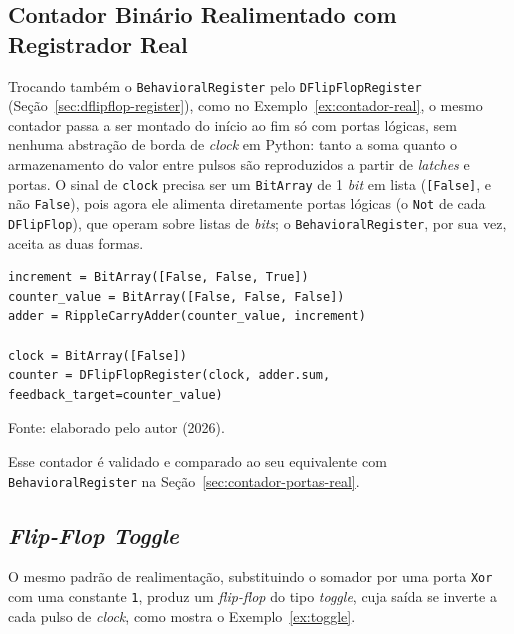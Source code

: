 \subsection{Contador Binário Realimentado com Registrador Real}
\label{sec:contador-registrador-real}

Trocando também o \texttt{BehavioralRegister} pelo \texttt{DFlipFlopRegister} (Seção~\ref{sec:dflipflop-register}), como no Exemplo~\ref{ex:contador-real}, o mesmo contador passa a ser montado do início ao fim só com portas lógicas, sem nenhuma abstração de borda de \textit{clock} em Python: tanto a soma quanto o armazenamento do valor entre pulsos são reproduzidos a partir de \textit{latches} e portas. O sinal de \texttt{clock} precisa ser um \texttt{BitArray} de 1 \textit{bit} em lista (\texttt{[False]}, e não \texttt{False}), pois agora ele alimenta diretamente portas lógicas (o \texttt{Not} de cada \texttt{DFlipFlop}), que operam sobre listas de \textit{bits}; o \texttt{BehavioralRegister}, por sua vez, aceita as duas formas.

\begin{exemplo}[H]
\caption{Contador binário de N \textit{bits} com registrador real (DFlipFlopRegister).}
\label{ex:contador-real}
\begin{verbatim}
increment = BitArray([False, False, True])
counter_value = BitArray([False, False, False])
adder = RippleCarryAdder(counter_value, increment)

clock = BitArray([False])
counter = DFlipFlopRegister(clock, adder.sum, feedback_target=counter_value)
\end{verbatim}
\begin{center}
\footnotesize Fonte: elaborado pelo autor (2026).
\end{center}
\end{exemplo}

Esse contador é validado e comparado ao seu equivalente com \texttt{BehavioralRegister} na Seção~\ref{sec:contador-portas-real}.

\subsection{\textit{Flip-Flop Toggle}}

O mesmo padrão de realimentação, substituindo o somador por uma porta \texttt{Xor} com uma constante \texttt{1}, produz um \textit{flip-flop} do tipo \textit{toggle}, cuja saída se inverte a cada pulso de \textit{clock}, como mostra o Exemplo~\ref{ex:toggle}.

